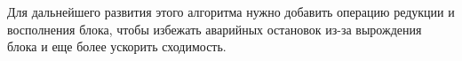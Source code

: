 Для дальнейшего развития этого алгоритма нужно добавить операцию редукции и восполнения
блока, чтобы избежать аварийных остановок из-за вырождения блока и еще более ускорить сходимость.  



\newpage
   